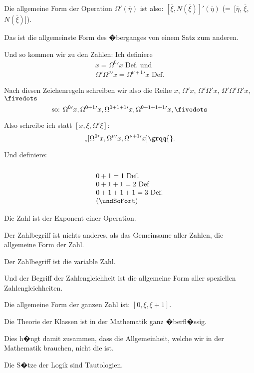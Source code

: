 {Die allgemeine Form der Operation $\Omega'(\overline{\eta})$ ist
also: $[\overline{\xi}, N(\overline{\xi})]'${}$(\overline{\eta})$ (=~[$\overline{\eta}$, $\overline{\xi}$, $N(\overline{\xi})$]).

Das ist die allgemeinste Form des �berganges
von einem Satz zum anderen.}


{Und so kommen wir zu den Zahlen: Ich definiere
\begin{gather*}
x = \Omega^{0}{}' x \text{ Def.\ und}\\
\Omega'\Omega^{\nu}{}'x = \Omega^{\nu+1}{}'x \text{ Def.}
\end{gather*}

Nach diesen Zeichenregeln schreiben wir also
die Reihe $x$, $\Omega'x$, $\Omega'\Omega'x$, $\Omega'\Omega'\Omega'x$, $\fivedots$
\[
\text{so: }\Omega^{0}{}'x, \Omega^{0+1}{}'x, \Omega^{0+1+1}{}'x, \Omega^{0+1+1+1}{}'x, \fivedots
\]

Also schreibe ich statt \glqq{}$[x, \xi, \Omega'\xi]$\grqq{}:
\[
\text{\quotedblbase} [\Omega^{0}{}'x, \Omega^{\nu}{}'x, \Omega^{\nu+1}{}'x]\text{\grqq{}.}
\]

Und definiere:
\[
\begin{array}{l}\\
0 + 1 = 1\text{ Def.}\\
0 + 1 + 1 = 2\text{ Def.}\\
0 + 1 + 1 + 1 = 3\text{ Def.}\\
\text{(\undSoFort)}
\end{array}
\]
}


{Die Zahl ist der Exponent einer Operation.}


{Der Zahlbegriff ist nichts anderes, als das
Gemeinsame aller Zahlen, die allgemeine Form
der Zahl.

Der Zahlbegriff ist die variable Zahl.

Und der Begriff der Zahlengleichheit ist die
allgemeine Form aller speziellen Zahlengleichheiten.}


{Die allgemeine Form der ganzen Zahl ist:
$[0, \xi, \xi + 1]$.}


{Die Theorie der Klassen ist in der Mathematik
ganz �berfl�ssig.

Dies h�ngt damit zusammen, dass die Allgemeinheit,
welche wir in der Mathematik brauchen,
nicht die  ist.}


{Die S�tze der Logik sind Tautologien.}


